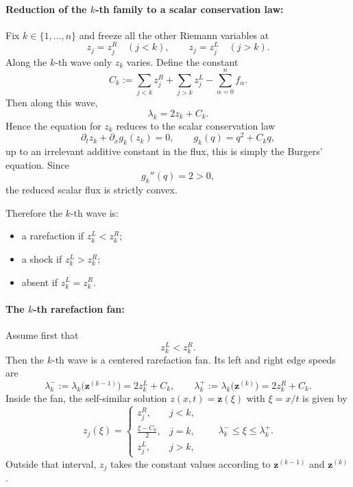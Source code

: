 \documentclass[12pt]{article}
\newcommand{\p}{\partial}
\begin{document}
\paragraph{Reduction of the $k$-th family to a scalar conservation law:}
Fix $k\in\{1,\dots,n\}$ and freeze all the other Riemann variables at
\[
z_j=z_j^R\quad (j<k),
\qquad
z_j=z_j^L\quad (j>k).
\]
Along the $k$-th wave only $z_k$ varies. Define the constant
\begin{equation}
C_k:=\sum_{j<k} z_j^R + \sum_{j>k} z_j^L - \sum_{\alpha=0}^n f_\alpha.
\label{eq:Ck}
\end{equation}
Then along this wave,
\begin{equation}
\lambda_k=2z_k+C_k.
\label{eq:lambda-k-reduced}
\end{equation}
Hence the equation for $z_k$ reduces to the scalar conservation law
\begin{equation}
\p_t z_k + \p_x g_k(z_k)=0,
\qquad
g_k(q)=q^2+C_k q,
\label{eq:scalar-reduction}
\end{equation}
up to an irrelevant additive constant in the flux, this is simply the Burgers' equation.
Since
\[
g_k''(q)=2>0,
\]
the reduced scalar flux is strictly convex.

Therefore the $k$-th wave is:
\begin{itemize}
\item a rarefaction if $z_k^L<z_k^R$;
\item a shock if $z_k^L>z_k^R$;
\item absent if $z_k^L=z_k^R$.
\end{itemize}
\paragraph{The $k$-th rarefaction fan:}Assume first that
\[
z_k^L<z_k^R.
\]
Then the $k$-th wave is a centered rarefaction fan. Its left and right edge speeds are
\begin{equation}
\lambda_k^-:=\lambda_k\bigl(\mathbf{z}^{(k-1)}\bigr)=2z_k^L+C_k,
\qquad
\lambda_k^+:=\lambda_k\bigl(\mathbf{z}^{(k)}\bigr)=2z_k^R+C_k.
\label{eq:rarefaction-edges}
\end{equation}
Inside the fan, the self-similar solution $z(x,t)=\mathbf{z}(\xi)$ with $\xi=x/t$ is given by
\begin{equation}
z_j(\xi)=
\begin{cases}
z_j^R,& j<k,\\
\displaystyle \frac{\xi-C_k}{2},& j=k,\\
z_j^L,& j>k,
\end{cases}
\qquad \lambda_k^-\le \xi\le \lambda_k^+.
\label{eq:rarefaction-profile}
\end{equation}
Outside that interval, $z_j$ takes the constant values according to $\mathbf{z}^{(k-1)}$ and $\mathbf{z}^{(k)}$.
\end{document}
